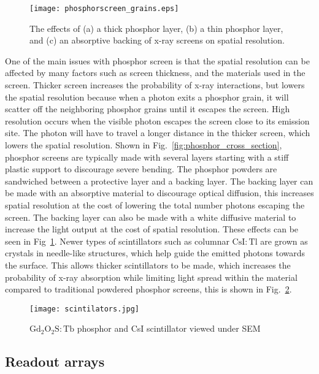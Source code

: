 \begin{figure}[ht]
\texttt{[image: phosphorscreen\_grains.eps]}
\caption{The effects of (a) a thick phosphor layer, (b) a thin phosphor layer, and (c) an absorptive backing of x-ray screens on spatial resolution.}
\label{fig:phosphor_effects}
\end{figure}

One of the main issues with phosphor screen is that the spatial resolution can be affected by many factors such as screen thickness, and the materials used in the screen.  Thicker screen increases the probability of x-ray interactions, but lowers the spatial resolution because when a photon exits a phosphor grain, it will scatter off the neighboring phosphor grains until it escapes the screen.  High resolution occurs when the visible photon escapes the screen close to its emission site.  The photon will have to travel a longer distance in the thicker screen, which lowers the spatial resolution.  Shown in Fig.~\ref{fig:phosphor_cross_section}, phosphor screens are typically made with several layers starting with a stiff plastic support to discourage severe bending.  The phosphor powders are sandwiched between a protective layer and a backing layer.  The backing layer can be made with an absorptive material to discourage optical diffusion, this increases spatial resolution at the cost of lowering the total number photons escaping the screen.  The backing layer can also be made with a white diffusive material to increase the light output at the cost of spatial resolution.  These effects can be seen in Fig~\ref{fig:phosphor_effects}.  Newer types of scintillators such as columnar $\mathrm{CsI:Tl}$ are grown as crystals in needle-like structures, which help guide the emitted photons towards the surface.  This allows thicker scintillators to be made, which increases the probability of x-ray absorption while limiting light spread within the material compared to traditional powdered phosphor screens, this is shown in Fig.~\ref{fig:scintillators}.

\begin{figure}[ht]
\texttt{[image: scintilators.jpg]}
\caption{$\mathrm{Gd_2O_2S:Tb}$ phosphor and CsI scintillator viewed under SEM~\citep{scintillatorImage}}
\label{fig:scintillators}
\end{figure}

\subsection{Readout arrays}

